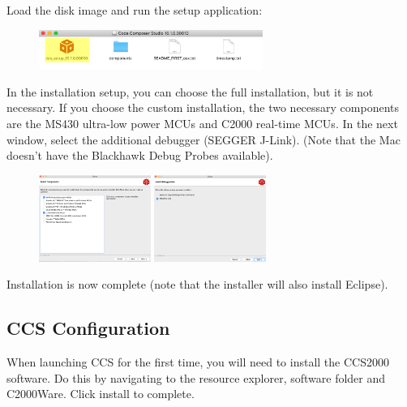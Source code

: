 \documentclass{article}
\begin{document}
Load the disk image and run the setup application:

\begin{figure}[H]
    \centering
  \includegraphics[width = 0.65\textwidth]{ccs_install_2} 
\end{figure}

In the installation setup, you can choose the full installation, but it is not necessary. If you choose the custom installation, the two necessary components are the MS430 ultra-low power MCUs and C2000 real-time MCUs. In the next window, select the additional debugger (SEGGER J-Link). (Note that the Mac doesn't have the Blackhawk Debug Probes available).

\begin{figure}[H]
    \centering
    {{\includegraphics[width=0.325\textwidth]{ccs_install_3.png} }}
    \qquad
    {{\includegraphics[width=0.325\textwidth]{ccs_install_4.png} }}
\end{figure}

Installation is now complete (note that the installer will also install Eclipse).

\pagebreak

\subsection{CCS Configuration}

When launching CCS for the first time, you will need to install the CCS2000 software. Do this by navigating to the resource explorer, software folder and C2000Ware. Click install to complete.
\end{document}

